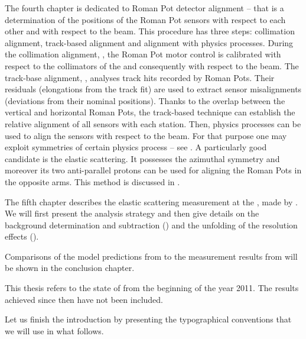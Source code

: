 The fourth chapter is dedicated to Roman Pot detector alignment -- that is a determination of the positions of the Roman Pot sensors with respect to each other and with respect to the beam. This procedure has three steps: collimation alignment, track-based alignment and alignment with physics processes. During the collimation alignment, , the Roman Pot motor control is calibrated with respect to the collimators of the  and consequently with respect to the beam. The track-base alignment, , analyses track hits recorded by Roman Pots. Their residuals (elongations from the track fit) are used to extract sensor misalignments (deviations from their nominal positions). Thanks to the overlap between the vertical and horizontal Roman Pots, the track-based technique can establish the relative alignment of all sensors with each station. Then, physics processes can be used to align the sensors with respect to the beam. For that purpose one may exploit symmetries of certain physics process -- see . A particularly good candidate is the elastic scattering. It possesses the azimuthal symmetry and moreover its two anti-parallel protons can be used for aligning the Roman Pots in the opposite arms. This method is discussed in .

The fifth chapter describes the elastic scattering measurement at the , made by . We will first present the analysis strategy and then give details on the background determination and subtraction () and the unfolding of the resolution effects ().

Comparisons of the model predictions from  to the measurement results from  will be shown in the conclusion chapter.

This thesis refers to the state of  from the beginning of the year 2011. The results achieved since then have not been included.


Let us finish the introduction by presenting the typographical conventions that we will use in what follows.

\centerline{\vbox{}}




\def\CaptionPrefix{\currentChapterNumber.}
